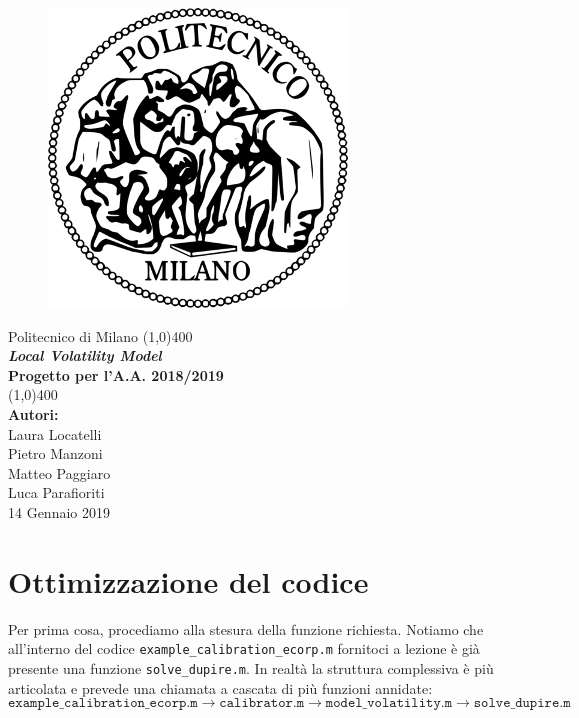 \documentclass[11pt]{article}
\begin{document}
\begin{titlepage}
\begin{center}
\begin{figure}[H]
	\centering
	\includegraphics[scale=0.35]{logo.png}
\end{figure}
\Large{Politecnico di Milano}
\vfill
\line(1,0){400}\\[1mm]
\huge{\textbf{\textit{Local Volatility Model}\\}}
\vspace*{1cm}
\Large{\textbf{Progetto per l'A.A. 2018/2019}}\\[1mm]
\line(1,0){400}\\
\vfill
\textbf{Autori:}\\
Laura Locatelli\\
Pietro Manzoni\\
Matteo Paggiaro\\
Luca Parafioriti\\
\vspace*{2cm}
14 Gennaio 2019
\end{center}
\end{titlepage}

\section{Ottimizzazione del codice}

Per prima cosa, procediamo alla stesura della funzione richiesta. Notiamo che all'interno del codice \texttt{example\_calibration\_ecorp.m} fornitoci a lezione è già presente una funzione \texttt{solve\_dupire.m}. In realtà la struttura complessiva è più articolata e prevede una chiamata a cascata di più funzioni annidate:
\
\begin{equation*}
	\texttt{example\_calibration\_ecorp.m} \rightarrow
	\texttt{calibrator.m} \rightarrow
	\texttt{model\_volatility.m}\rightarrow
	\texttt{solve\_dupire.m}
\end{equation*}
\end{document}
